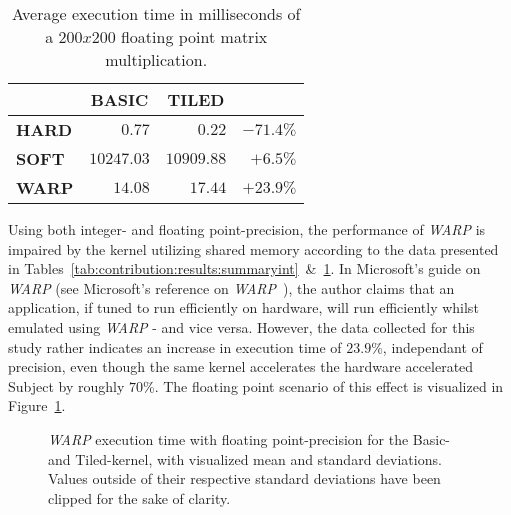 \begin{table}[hbt]
\begin{center}
\begin{tabular}{r|r|r|r|}
	\cline{2-3}
							& \multicolumn{1}{|c|}{\textbf{BASIC}} & \multicolumn{1}{|c|}{\textbf{TILED}}	\\ \hline
	\multicolumn{1}{|l|}{\textbf{HARD}}	& $0.77$			& $0.22$		& $-71.4\%$  				\\ \hline
	\multicolumn{1}{|l|}{\textbf{SOFT}}	& $10247.03$		& $10909.88$	& $+6.5\%$   				\\ \hline
	\multicolumn{1}{|l|}{\textbf{WARP}}	& $14.08$			& $17.44$		& $+23.9\%$  				\\ \hline
\end{tabular}
\end{center}
\caption{Average execution time in milliseconds of a $200x200$ floating point matrix multiplication.}
\label{tab:contribution:results:summaryfloat}
\end{table}

Using both integer- and floating point-precision, the performance of \textit{WARP} is impaired by the kernel utilizing shared memory according to the data presented in Tables~\ref{tab:contribution:results:summaryint}~\&~\ref{tab:contribution:results:summaryfloat}.
In Microsoft's guide on \textit{WARP} (see Microsoft's reference on \textit{WARP}~), the author claims that an application, if tuned to run efficiently on hardware, will run efficiently whilst emulated using \textit{WARP} - and vice versa.
However, the data collected for this study rather indicates an increase in execution time of $23.9$\%, independant of precision, even though the same kernel accelerates the hardware accelerated Subject by roughly $70$\%.
The floating point scenario of this effect is visualized in Figure~\ref{fig:contribution:results:warp:msswarp}.

\begin{figure}[htb]
\begin{center}
	\resizebox{ \columnwidth }{!}{}
	\caption{\textit{WARP} execution time with floating point-precision for the Basic- and Tiled-kernel, with visualized mean and standard deviations. Values outside of their respective standard deviations have been clipped for the sake of clarity.}
	\label{fig:contribution:results:warp:msswarp}
\end{center}
\end{figure}


